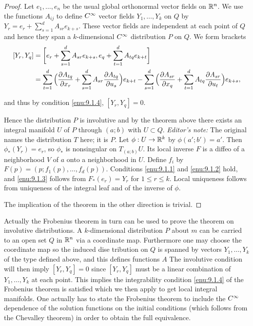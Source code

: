 \documentclass[../main]{subfiles}
\begin{document}
\begin{proof}

Let $e_{1}, \ldots, e_{n}$ be the usual global orthonormal vector fields on $\mathbb{R}^{n}$. We use the functions $A_{i j}$ to define $C^\infty$ vector fields $Y_{1}, \ldots, Y_{k}$ on $Q$ by \newline $Y_{r}=e_{r}+\sum_{s=1}^{d} A_{s r} e_{k+s}$. These vector fields are independent at each point of $Q$ and hence they span a $k$-dimensional $C^\infty$ distribution $P$ on $Q .$ We form brackets
\[\begin{split}
[Y_{r}, Y_{q}]&=\bigg[e_{r}+\sum_{s=1}^{d} A_{s r} e_{k+s}, e_{q}+\sum_{t=1}^{d} A_{t q} e_{k+t}\bigg]\\
&=\sum_{t=1}^{d}\Big(\dfrac{\partial A_{tq}}{\partial x_r}+\sum_{s=1}^{d} A_{s r} \dfrac{\partial A_{tq}}{\partial u_s}\Big) e_{k+t}-\sum_{s=1}^{d}\Big(\dfrac{\partial A_{sr}}{\partial x_q}+\sum_{t=1}^{d} A_{t q} \dfrac{\partial A_{sr}}{\partial u_t}\Big) e_{k+s},\end{split}\]

and thus by condition  \ref{enu:9.1.4}, $[Y_{r}, Y_{q}]=0$.

Hence the distribution $P$ is involutive and by the theorem above there exists an integral manifold $U$ of $P$ through $(a;b)$ with $U\subset Q$. \emph{Editor's note:} The original names the distribution $T$ here; it is $P$. Let $\phi:U\to\mathbb{R}^k$ by $\phi(a';b')=a'$. Then $\phi_\ast(Y_r)=e_r$, so $\phi_\ast$ is nonsingular on $T_{(a;b)}U$. Its local inverse $F$ is a diffeo of a neighborhood $V$ of $a$ onto a neighborhood in $U$. Define $f_i$ by $F(p)=(p;f_1(p),\ldots,f_d(p))$. Conditions \ref{enu:9.1.1} and \ref{enu:9.1.2} hold, and \ref{enu:9.1.3} follows from $F_\ast(e_r)=Y_r$ for $1\leq r\leq k$. Local uniqueness follows from uniqueness of the integral leaf and of the inverse of $\phi$.

The implication of the theorem in the other direction is trivial.\end{proof} 

Actually the Frobenius theorem in turn can be used to prove the theorem on involutive distributions. A $k$-dimensional distribution $P$ about $m$ can be carried to an open set $Q$ in $\mathbb{R}^{n}$ via a coordinate map. Furthermore one may choose the coordinate map so the induced dise tribution on $Q$ is spanned by vectors $Y_{1}, \ldots, Y_{k}$ of the type defined above, and this defines functions $A$ The involutive condition will then imply $[Y_{r}, Y_{q}]=0$ since $[Y_{r}, Y_{q}]$ must be a linear combination of $Y_{1}, \ldots, Y_{k}$ at each point. This implies the integrability condition \ref{enu:9.1.4} of the Frobenius theorem is satisfied which we then apply to get local integral manifolds. One actually has to state the Frobenius theorem to include the $C^\infty$ dependence of the solution functions on the initial conditions (which follows from the Chevalley theorem) in order to obtain the full equivalence. %
\end{document}
